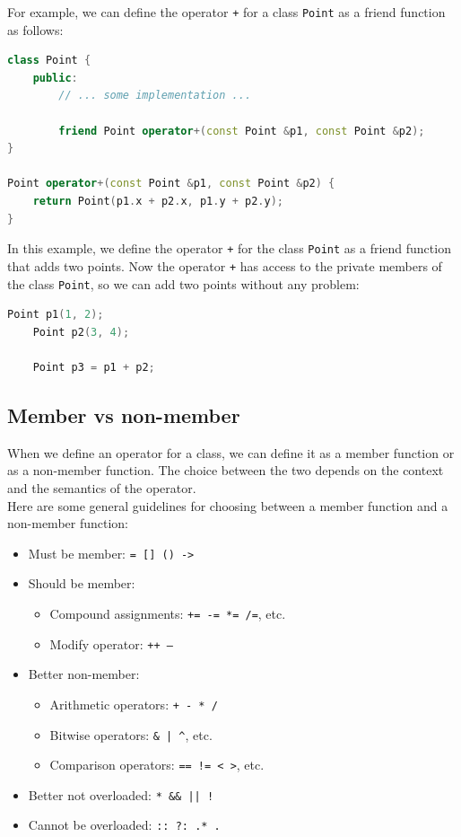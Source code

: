 For example, we can define the operator \texttt{+} for a class \texttt{Point} as a
friend function as follows:\\

\begin{lstlisting}[language=C++]
class Point {
    public:
        // ... some implementation ...

        friend Point operator+(const Point &p1, const Point &p2);
}

Point operator+(const Point &p1, const Point &p2) {
    return Point(p1.x + p2.x, p1.y + p2.y);
}
\end{lstlisting}

In this example, we define the operator \texttt{+} for the class \texttt{Point} as a
friend function that adds two points. Now the operator \texttt{+} has access to the
private members of the class \texttt{Point}, so we can add two points without any
problem:\\

\begin{lstlisting}[language=C++]
    Point p1(1, 2);
    Point p2(3, 4);
    
    Point p3 = p1 + p2;
\end{lstlisting}

\subsection{Member vs non-member}

When we define an operator for a class, we can define it as a member function or as
a non-member function. The choice between the two depends on the context and the
semantics of the operator.\\

Here are some general guidelines for choosing between a member function and a non-member
function:

\begin{itemize}
    \item Must be member: \texttt{= [] () ->}
    \item Should be member:
        \begin{itemize}
            \item Compound assignments: \texttt{+= -= *= /=}, etc.
            \item Modify operator: \texttt{++ --}
        \end{itemize}
    \item Better non-member:
        \begin{itemize}
            \item Arithmetic operators: \texttt{+ - * /}
            \item Bitwise operators: \texttt{\& | \^}, etc.
            \item Comparison operators: \texttt{== != < >}, etc.
        \end{itemize}
    \item Better not overloaded: \texttt{* \&\& || !}
    \item Cannot be overloaded: \texttt{:: ?: .* .}
\end{itemize}

